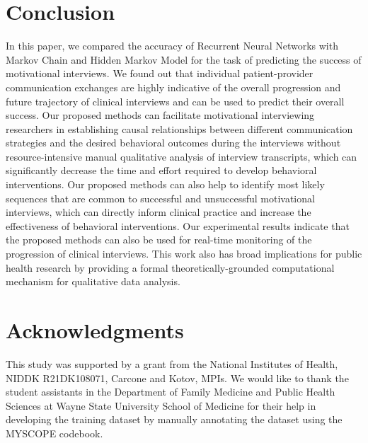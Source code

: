 \documentclass{amia_summit_2018}
\begin{document}
\section*{Conclusion}
In this paper, we compared the accuracy of Recurrent Neural Networks with Markov Chain and Hidden Markov Model for the task of predicting the success of motivational interviews. We found out
that individual patient-provider communication exchanges are highly indicative of the overall progression and future trajectory of clinical interviews and can be used to predict their overall success.
Our proposed methods can facilitate motivational interviewing researchers in establishing causal relationships between different communication strategies and the desired behavioral outcomes during the
interviews without resource-intensive manual qualitative analysis of interview transcripts, which can significantly decrease the time and effort required to develop behavioral interventions. Our
proposed methods can also help to identify most likely sequences that are common to successful and unsuccessful motivational interviews, which can directly inform clinical practice and increase
the effectiveness of behavioral interventions. Our experimental results indicate that the proposed methods can also be used for real-time monitoring of the progression of clinical interviews. This
work also has broad implications for public health research by providing a formal theoretically-grounded computational mechanism for qualitative data analysis.

\section*{Acknowledgments}
This study was supported by a grant from the National Institutes of Health, NIDDK R21DK108071, Carcone and Kotov, MPIs. We would like to thank the student assistants in the Department of Family Medicine and Public Health Sciences at Wayne State University School of Medicine for their help in developing the training dataset by manually annotating the dataset using the MYSCOPE codebook. 




\end{document}

